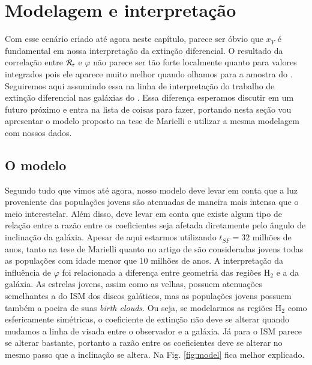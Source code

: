 \section{Modelagem e interpretação}
\label{sec:difextin:modeleinterp}

Com esse cenário criado até agora neste capítulo, parece ser óbvio que $x_Y$ é fundamental em nossa
interpretação da extinção diferencial. O resultado da correlação entre $\mathcal{R}_\tau$ e $\varphi$
não parece ser tão forte localmente quanto para valores integrados pois ele aparece muito melhor
quando olhamos para a amostra do \SDSS. Seguiremos aqui assumindo essa na linha de interpretação do
trabalho de extinção diferencial nas galáxias do \SDSS. Essa diferença esperamos discutir em um
futuro próximo e entra na lista de coisas para fazer, portando nesta seção vou apresentar o modelo
proposto na tese de Marielli e utilizar a mesma modelagem com nossos dados.

\subsection{O modelo}
\label{sec:difextin:modeleinterp:model}

Segundo tudo que vimos até agora, nosso modelo deve levar em conta que a luz proveniente das
populações jovens são atenuadas de maneira mais intensa que o meio interestelar. Além disso, deve
levar em conta que existe algum tipo de relação entre a razão entre os coeficientes seja afetada
diretamente pelo ângulo de inclinação da galáxia. Apesar de aqui estarmos utilizando $t_{SF} = 32$
milhões de anos, tanto na tese de Marielli quanto no artigo de \citet{Charlot.Fall.2000a} são
consideradas jovens todas as populações com idade menor que 10 milhões de anos. A interpretação da
influência de $\varphi$ foi relacionada a diferença entre geometria das regiões $\mathrm{H}_2$ e a
da galáxia. As estrelas jovens, assim como as velhas, possuem atenuações semelhantes a do ISM dos
discos galáticos, mas as populações jovens possuem também a poeira de suas {\em birth clouds}. Ou
seja, se modelarmos as regiões $\mathrm{H}_2$ como esfericamente simétricas, o coeficiente de
extinção não deve se alterar quando mudamos a linha de visada entre o observador e a galáxia. Já
para o ISM parece se alterar bastante, portanto a razão entre os coeficientes deve se alterar no
mesmo passo que a inclinação se altera. Na Fig. \ref{fig:model} fica melhor explicado.

